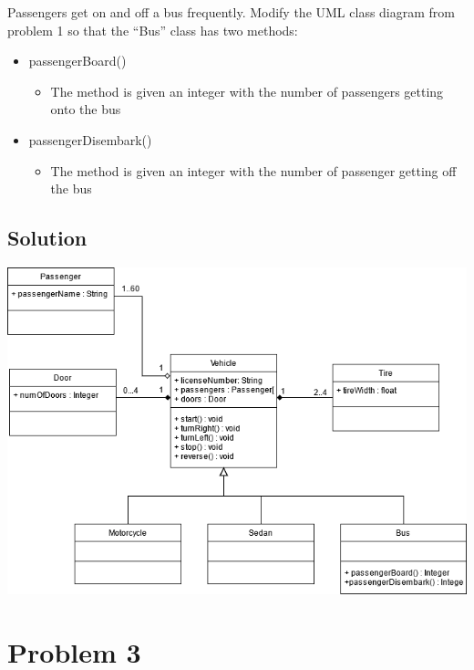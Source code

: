 \documentclass{article}
\begin{document}
    Passengers get on and off a bus frequently. Modify the UML class diagram from problem
    1 so that the “Bus” class has two methods:

    \begin{itemize}
        \item 
        passengerBoard()
        \begin{itemize}
            \item 
            The method is given an integer with the number of passengers getting
            onto the bus
        \end{itemize}
        \item
        passengerDisembark()
        \begin{itemize}
            \item 
            The method is given an integer with the number of passenger getting off
            the bus
        \end{itemize}
    \end{itemize}

    \subsection*{Solution}

    \begin{center}
        \includegraphics[scale=0.55]{E3_Q2.png}
    \end{center}


    \section*{Problem 3}
\end{document}
